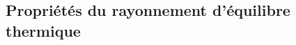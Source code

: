 \documentclass[12pt,fancy]{cours}
\begin{document}
%



\subsection{Propriétés du rayonnement d'équilibre thermique}
\end{document}

